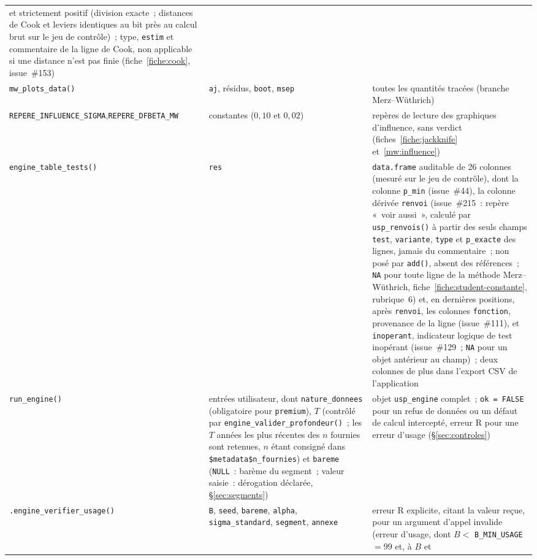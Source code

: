 \documentclass[a4paper,11pt]{article}
\newcommand{\code}[1]{\texttt{\small #1}}
\begin{document}
{\begin{longtable}{@{}p{4.6cm}p{4.0cm}p{6.2cm}@{}}
et strictement positif (division exacte~; distances de Cook et leviers identiques au bit près au
calcul brut sur le jeu de contrôle)~; type, \code{estim} et commentaire de la ligne de Cook, non applicable si une
distance n'est pas finie (fiche~\ref{fiche:cook}, issue~\#153) \\
\code{mw\_plots\_data()} & \code{aj}, résidus, \code{boot}, \code{msep} &
toutes les quantités tracées (branche Merz--Wüthrich) \\
\code{REPERE\_INFLUENCE\_SIGMA},\newline \code{REPERE\_DFBETA\_MW} & constantes ($0{,}10$ et
$0{,}02$) & repères de lecture des graphiques d'influence, sans verdict
(fiches~\ref{fiche:jackknife} et~\ref{mw:influence}) \\
\code{engine\_table\_tests()} & \code{res} & \code{data.frame} auditable de 26 colonnes (mesuré
sur le jeu de contrôle), dont la colonne \code{p\_min} (issue~\#44), la colonne dérivée
\code{renvoi} (issue~\#215~: repère «~voir aussi~», calculé par \code{usp\_renvois()} à partir des
seuls champs \code{test}, \code{variante}, \code{type} et \code{p\_exacte} des lignes, jamais du
commentaire~; non posé par \code{add()}, absent des références~; \code{NA} pour toute ligne de la
méthode Merz--Wüthrich, fiche~\ref{fiche:student-constante}, rubrique~6) et, en dernières
positions, après \code{renvoi}, les colonnes \code{fonction},
provenance de la ligne (issue~\#111), et \code{inoperant}, indicateur logique de test inopérant
(issue~\#129~; \code{NA} pour un objet antérieur au champ)~; deux colonnes de plus dans l'export
CSV de l'application \\
\code{run\_engine()} & entrées utilisateur, dont \code{nature\_donnees} (obligatoire pour
\code{premium}), $T$ (contrôlé par \code{engine\_valider\_}\newline\code{profondeur()}~; les $T$
années les plus récentes des $n$ fournies sont retenues, $n$ étant consigné dans
\code{\$metadata\$n\_fournies}) et
\code{bareme} (\code{NULL}~: barème du segment~; valeur saisie~: dérogation déclarée,
§\ref{sec:segments}) & objet
\code{usp\_engine}
complet~; \code{ok = FALSE} pour un refus de données ou un défaut de calcul intercepté, erreur
R pour une erreur d'usage (§\ref{sec:controles}) \\
\code{.engine\_verifier\_}\newline\code{usage()} & \code{B}, \code{seed}, \code{bareme},
\code{alpha}, \code{sigma\_standard}, \code{segment}, \code{annexe} & erreur R explicite, citant la valeur reçue, pour un
argument d'appel invalide (erreur d'usage, dont $B <$ \code{B\_MIN\_USAGE} $= 99$ et, à $B$ et

\end{longtable}}
\end{document}
